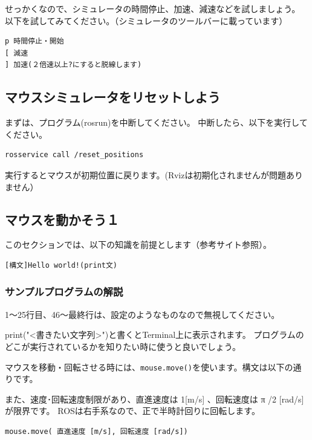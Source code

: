 \documentclass[11pt,a4paper]{jsarticle}
\begin{document}
せっかくなので、シミュレータの時間停止、加速、減速などを試しましょう。
以下を試してみてください。（シミュレータのツールバーに載っています）
\begin{lstlisting}[frame=single]
p 時間停止・開始
[ 減速
] 加速(２倍速以上?にすると脱線します)
\end{lstlisting}


\subsection{マウスシミュレータをリセットしよう}
まずは、プログラム(rosrun)を中断してください。
中断したら、以下を実行してください。
\begin{lstlisting}[frame=single]
rosservice call /reset_positions
\end{lstlisting}
実行するとマウスが初期位置に戻ります。(Rvizは初期化されませんが問題ありません）


\newpage
\subsection{マウスを動かそう１}
このセクションでは、以下の知識を前提とします（参考サイト参照）。
\begin{lstlisting}[frame=single]
[構文]Hello world!(print文)
\end{lstlisting}

\subsubsection{サンプルプログラムの解説}
1〜25行目、46〜最終行は、設定のようなものなので無視してください。


print("<書きたい文字列>")と書くとTerminal上に表示されます。
プログラムのどこが実行されているかを知りたい時に使うと良いでしょう。

マウスを移動・回転させる時には、\verb|mouse.move()|を使います。構文は以下の通りです。

また、速度･回転速度制限があり、直進速度は 1[m/s] 、回転速度は π /2 [rad/s] が限界です。
ROSは右手系なので、正で半時計回りに回転します。

\begin{lstlisting}[frame=single]
mouse.move( 直進速度 [m/s], 回転速度 [rad/s])
\end{lstlisting}


\end{document}
